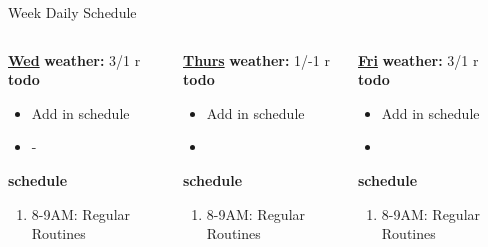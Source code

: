 \begin{columns}
\begin{column}{0.5\linewidth}
{\begin{block}{Week Daily Schedule}
\begin{columns}
          \begin{column}{0.14\textwidth}{\small \underline{\bf Wed}}
            {\small \bf weather: } 3/1 r \\ 
            \small{\bf todo}\\
            \begin{itemize}
              \tiny \item \tiny Add in schedule
            \item \tiny -
            \end{itemize} 
                {\small {\bf schedule}}\\
                \begin{enumerate} 
                  \tiny \item \tiny 8-9AM: Regular Routines 
                \end{enumerate} 
          \end{column}

          \begin{column}{0.14\textwidth}{\small \underline{\bf Thurs}}
            {\small \bf weather: } 1/-1 r \\ 
            {\small {\bf todo}} \\ 
            \begin{itemize}
              \tiny \item \tiny Add in schedule
            \item \tiny 
            \end{itemize} 
                {\small {\bf schedule}} \\
                \begin{enumerate} 
                  \tiny \item \tiny 8-9AM: Regular Routines 
                \end{enumerate}
          \end{column} 
          
          \begin{column}{0.14\textwidth}{\small \underline{\bf Fri}}
            {\small \bf weather: } 3/1 r \\ 
            {\small {\bf todo}} \\ 
            \begin{itemize}
              \tiny \item \tiny Add in schedule
            \item \tiny 
            \end{itemize} 
                {\small {\bf schedule}} \\
                \begin{enumerate} 
                  \tiny \item \tiny 8-9AM: Regular Routines 
                \end{enumerate}
          \end{column}


\end{columns}
\end{block}}
\end{column}
\end{columns}
